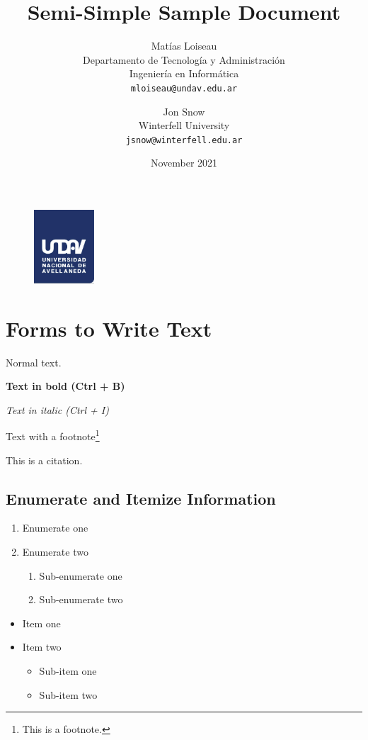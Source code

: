 \documentclass{article} %
\title{Semi-Simple Sample Document}
\date{November 2021}
\author{
    Matías Loiseau\\
    Departamento de Tecnología y Administración\\
    Ingeniería en Informática\\
    \texttt{mloiseau@undav.edu.ar}
    \and
    Jon Snow\\
    Winterfell University\\
    \texttt{jsnow@winterfell.edu.ar}
}
\begin{document}
\begin{figure}
    \centering
    \includegraphics[width=0.2\textwidth]{images/undav-logo}
    \label{fig:undav-logo}
\end{figure}

\maketitle %
\thispagestyle{empty} %
\clearpage

\tableofcontents %
\clearpage

\section{Forms to Write Text} %
Normal text.

\textbf{Text in bold (Ctrl + B)}

\textit{Text in italic (Ctrl + I)}

Text with a footnote\footnote{This is a footnote.}

This is a citation\cite{knn}.

\subsection{Enumerate and Itemize Information}

\begin{enumerate}
    \item Enumerate one
    \item Enumerate two
    \begin{enumerate}
        \item Sub-enumerate one
        \item Sub-enumerate two
    \end{enumerate}
\end{enumerate}

\begin{itemize}
    \item Item one
    \item Item two
    \begin{itemize}
        \item Sub-item one
        \item Sub-item two
    \end{itemize}
\end{itemize}
\end{document}
